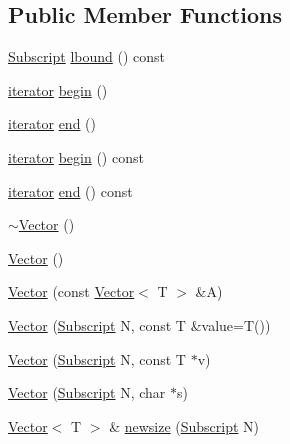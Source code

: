 \subsection*{Public Member Functions}
\begin{DoxyCompactItemize}
\item 
\hyperlink{namespaceTNT_af22e3f1460e145c04ce4e7d701e4c1c1}{Subscript} \hyperlink{classTNT_1_1Vector_a9483848bb84407f8f68ffe2fe1b72770}{lbound} () const
\item 
\hyperlink{classTNT_1_1Vector_a7289b2334c4c28181bb4193fa32fc48a}{iterator} \hyperlink{classTNT_1_1Vector_a8be20c12f428f0762ff546d7146141a1}{begin} ()
\item 
\hyperlink{classTNT_1_1Vector_a7289b2334c4c28181bb4193fa32fc48a}{iterator} \hyperlink{classTNT_1_1Vector_a3cf2f31a09a1d5b001e073a07fe13b72}{end} ()
\item 
\hyperlink{classTNT_1_1Vector_a7289b2334c4c28181bb4193fa32fc48a}{iterator} \hyperlink{classTNT_1_1Vector_a2a3e40f24376f1578eeb67a39813e580}{begin} () const
\item 
\hyperlink{classTNT_1_1Vector_a7289b2334c4c28181bb4193fa32fc48a}{iterator} \hyperlink{classTNT_1_1Vector_a12286b3352a06faa1b38626ceb79c35a}{end} () const
\item 
\hyperlink{classTNT_1_1Vector_a29e491d8f3a77612be73b6b69c04f060}{$\sim$\+Vector} ()
\item 
\hyperlink{classTNT_1_1Vector_a55481f65669664062299cef9a44f9e2e}{Vector} ()
\item 
\hyperlink{classTNT_1_1Vector_a271230d277812e5233ba912bd5932edc}{Vector} (const \hyperlink{classTNT_1_1Vector}{Vector}$<$ T $>$ \&A)
\item 
\hyperlink{classTNT_1_1Vector_aa329e3e0b9ef92bed1958b31d16742e2}{Vector} (\hyperlink{namespaceTNT_af22e3f1460e145c04ce4e7d701e4c1c1}{Subscript} N, const T \&value=T())
\item 
\hyperlink{classTNT_1_1Vector_ac4709b0750a97e66ecd1ffbf9e45a8ea}{Vector} (\hyperlink{namespaceTNT_af22e3f1460e145c04ce4e7d701e4c1c1}{Subscript} N, const T $\ast$v)
\item 
\hyperlink{classTNT_1_1Vector_a89ae28b74f28b6ba72fbc425937d3603}{Vector} (\hyperlink{namespaceTNT_af22e3f1460e145c04ce4e7d701e4c1c1}{Subscript} N, char $\ast$s)
\item 
\hyperlink{classTNT_1_1Vector}{Vector}$<$ T $>$ \& \hyperlink{classTNT_1_1Vector_a6c02daa35702d244ca08c079ba490864}{newsize} (\hyperlink{namespaceTNT_af22e3f1460e145c04ce4e7d701e4c1c1}{Subscript} N)
\item 

\end{DoxyCompactItemize}
